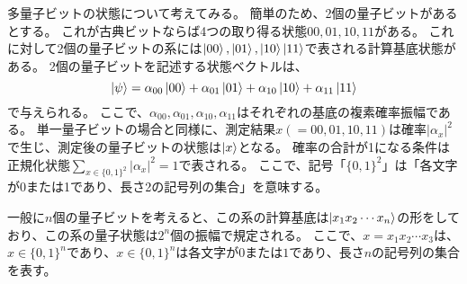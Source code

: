 \begin{comment}
    多量子ビット
\end{comment}


多量子ビットの状態について考えてみる。
簡単のため、2個の量子ビットがあるとする。
これが古典ビットならば4つの取り得る状態$00, 01, 10, 11$がある。
これに対して2個の量子ビットの系には$\ket{00}, \ket{01}, \ket{10} \ket{11}$で表される計算基底状態がある。
2個の量子ビットを記述する状態ベクトルは、
\begin{equation}
    \label{eq: QuantumComputationAndQuantumInfomation.1.5}
    \ket{\psi} = \alpha_{00} \ket{00} + \alpha_{01} \ket{01} + \alpha_{10} \ket{10} + \alpha_{11} \ket{11}
\end{equation}
で与えられる。
ここで、$\alpha_{00}, \alpha_{01}, \alpha_{10}, \alpha_{11}$はそれぞれの基底の複素確率振幅である。
単一量子ビットの場合と同様に、測定結果$x(= 00, 01, 10, 11)$は確率$|\alpha_x|^2$で生じ、測定後の量子ビットの状態は$\ket{x}$となる。
確率の合計が1になる条件は正規化状態$\sum_{x \in \{0, 1\}^2} |\alpha_x|^2 = 1$で表される。
ここで、記号「$\{0, 1\}^2$」は「各文字が0または1であり、長さ2の記号列の集合」を意味する。

一般に$n$個の量子ビットを考えると、この系の計算基底は$\ket{x_1 x_2 \cdots x_n}$の形をしており、この系の量子状態は$2^n$個の振幅で規定される。
ここで、$x = x_1 x_2 \cdots x_3$は、$x \in \{ 0, 1 \}^n$であり、$x \in \{ 0, 1 \}^n$は各文字が$0$または$1$であり、長さ$n$の記号列の集合を表す。